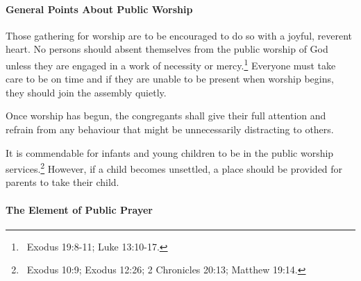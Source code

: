 \begin{outerlst}[left=0pt,labelsep=0pt]
\paragraph[General Points About Public Worship]{General Points About Public Worship}  

\begin{innerlst}[resume*]
      \item Those gathering for worship are to be encouraged to do so with a joyful, reverent heart. No persons should absent themselves from the public worship of God unless they are engaged in a work of necessity or mercy.\footnote{\ Exodus 19:8-11; Luke 13:10-17.} Everyone must take care to be on time and if they are unable to be present when worship begins, they should join the assembly quietly.
      \item Once worship has begun, the congregants shall give their full attention and refrain from any behaviour that might be unnecessarily distracting to others.
      \item It is commendable for infants and young children to be in the public worship services.\footnote{\ Exodus 10:9; Exodus 12:26; 2 Chronicles 20:13; Matthew 19:14.} However, if a child becomes unsettled, a place should be provided for parents to take their child. 
\end{innerlst} 

\paragraph[The Element of Public Prayer]{The Element of Public Prayer}  


\end{outerlst}
